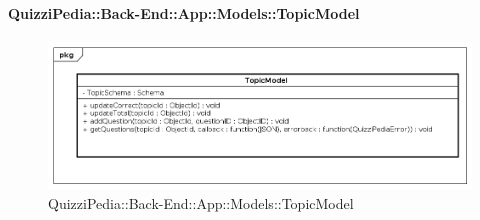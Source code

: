 \paragraph{QuizziPedia::Back-End::App::Models::TopicModel}
\label{QuizziPedia::Back-End::App::Models::TopicModel}
\begin{figure}
	\centering
	\includegraphics[scale=0.45]{UML/Package/QuizziPedia_Back-End_App_Models_topicModel.png}
	\caption{QuizziPedia::Back-End::App::Models::TopicModel}
\end{figure}
